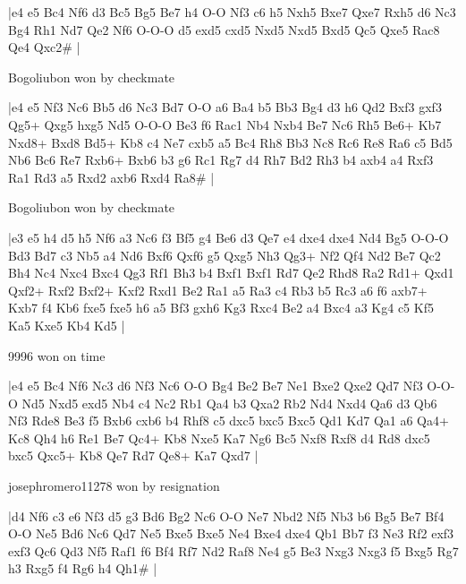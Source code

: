\makegametitle
|e4 e5 Bc4 Nf6 d3 Bc5 Bg5 Be7 h4 O-O Nf3 c6 h5 Nxh5 Bxe7 Qxe7 Rxh5 d6 Nc3 Bg4 Rh1 Nd7 Qe2 Nf6 O-O-O d5 exd5 cxd5 Nxd5 Nxd5 Bxd5 Qc5 Qxe5 Rac8 Qe4 Qxc2\#  |

\showboard

Bogoliubon won by checkmate

\makegametitle
|e4 e5 Nf3 Nc6 Bb5 d6 Nc3 Bd7 O-O a6 Ba4 b5 Bb3 Bg4 d3 h6 Qd2 Bxf3 gxf3 Qg5+ Qxg5 hxg5 Nd5 O-O-O Be3 f6 Rac1 Nb4 Nxb4 Be7 Nc6 Rh5 Be6+ Kb7 Nxd8+ Bxd8 Bd5+ Kb8 c4 Ne7 cxb5 a5 Bc4 Rh8 Bb3 Nc8 Rc6 Re8 Ra6 c5 Bd5 Nb6 Bc6 Re7 Rxb6+ Bxb6 b3 g6 Rc1 Rg7 d4 Rh7 Bd2 Rh3 b4 axb4 a4 Rxf3 Ra1 Rd3 a5 Rxd2 axb6 Rxd4 Ra8\#  |

\showboard

Bogoliubon won by checkmate

\makegametitle
|e3 e5 h4 d5 h5 Nf6 a3 Nc6 f3 Bf5 g4 Be6 d3 Qe7 e4 dxe4 dxe4 Nd4 Bg5 O-O-O Bd3 Bd7 c3 Nb5 a4 Nd6 Bxf6 Qxf6 g5 Qxg5 Nh3 Qg3+ Nf2 Qf4 Nd2 Be7 Qc2 Bh4 Nc4 Nxc4 Bxc4 Qg3 Rf1 Bh3 b4 Bxf1 Bxf1 Rd7 Qe2 Rhd8 Ra2 Rd1+ Qxd1 Qxf2+ Rxf2 Bxf2+ Kxf2 Rxd1 Be2 Ra1 a5 Ra3 c4 Rb3 b5 Rc3 a6 f6 axb7+ Kxb7 f4 Kb6 fxe5 fxe5 h6 a5 Bf3 gxh6 Kg3 Rxc4 Be2 a4 Bxc4 a3 Kg4 c5 Kf5 Ka5 Kxe5 Kb4 Kd5  |

\showboard

9996 won on time

\makegametitle
|e4 e5 Bc4 Nf6 Nc3 d6 Nf3 Nc6 O-O Bg4 Be2 Be7 Ne1 Bxe2 Qxe2 Qd7 Nf3 O-O-O Nd5 Nxd5 exd5 Nb4 c4 Nc2 Rb1 Qa4 b3 Qxa2 Rb2 Nd4 Nxd4 Qa6 d3 Qb6 Nf3 Rde8 Be3 f5 Bxb6 cxb6 b4 Rhf8 c5 dxc5 bxc5 Bxc5 Qd1 Kd7 Qa1 a6 Qa4+ Kc8 Qh4 h6 Re1 Be7 Qc4+ Kb8 Nxe5 Ka7 Ng6 Bc5 Nxf8 Rxf8 d4 Rd8 dxc5 bxc5 Qxc5+ Kb8 Qe7 Rd7 Qe8+ Ka7 Qxd7  |

\showboard

josephromero11278 won by resignation

\makegametitle
|d4 Nf6 c3 e6 Nf3 d5 g3 Bd6 Bg2 Nc6 O-O Ne7 Nbd2 Nf5 Nb3 b6 Bg5 Be7 Bf4 O-O Ne5 Bd6 Nc6 Qd7 Ne5 Bxe5 Bxe5 Ne4 Bxe4 dxe4 Qb1 Bb7 f3 Ne3 Rf2 exf3 exf3 Qc6 Qd3 Nf5 Raf1 f6 Bf4 Rf7 Nd2 Raf8 Ne4 g5 Be3 Nxg3 Nxg3 f5 Bxg5 Rg7 h3 Rxg5 f4 Rg6 h4 Qh1\#  |

